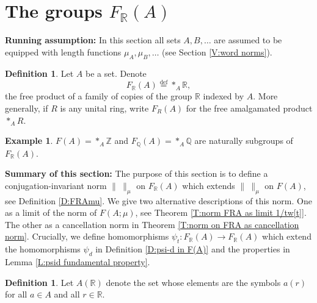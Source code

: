 \documentclass[12pt]{amsart}
\theoremstyle{definition}
\newtheorem{defn}[prop]{Definition}
\newtheorem{examplex}{Example}
\def\QQ{\ensuremath{\mathbb{Q}}}
\def\RR{\ensuremath{\mathbb{R}}}
\def\ZZ{\ensuremath{\mathbb{Z}}}
\def\Free{F}
\begin{document}

%
\section{The groups $\Free_\RR(A)$}\label{Sec:FRA and FQA}


\noindent
{\bf Running assumption:}
In this section all sets $A,B,\dots$ are assumed to be equipped with length functions $\mu_A,\mu_B,\dots$ (see Section \ref{V:word norms}).



\begin{defn}
Let $A$ be a set.
Denote
\[
\Free_\RR(A) \overset{\text{def}}{=} *_A \RR,
\]
the free product of a family of copies of the group  $\RR$ indexed by $A$.
More generally, if $R$ is any unital ring, write $\Free_R(A)$ for the free amalgamated product $*_A R$.
\end{defn}


\begin{examplex}
$\Free(A)=*_A \ZZ$ and $\Free_\QQ(A)=*_A \QQ$ are naturally  subgroups of $\Free_\RR(A)$.
\end{examplex}


\noindent
{\bf Summary of this section:}
The purpose of this section is to define a conjugation-invariant norm $\| \ \|_{\mu}$ on $\Free_\RR(A)$ which extends $\| \ \|_\mu$ on $\Free(A)$, see Definition \ref{D:FRAmu}.
We give two  alternative descriptions of this norm.
One as a limit of the norm of $\Free(A;\mu)$, see Theorem \ref{T:norm FRA as limit 1/tw[t]}.
The other as a cancellation norm in Theorem \ref{T:norm on FRA as cancellation norm}.
Crucially, we define homomorphisms $\psi_t \colon \Free_\RR(A) \to \Free_\RR(A)$ which extend the homomorphisms $\psi_d$ in Definition \ref{D:psi-d in F(A)} and the properties in Lemma \ref{L:psid fundamental property}.






\begin{defn}
Let $A(\RR)$ denote the set whose elements are the symbols $a(r)$ for all $a \in A$ and all $r \in \RR$.
\end{defn}
\end{document}
